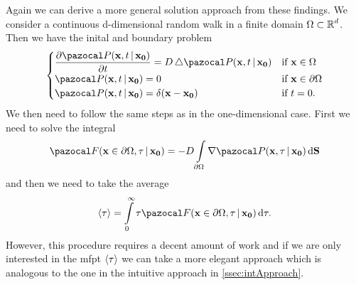 \bigskip

\noindent Again we can derive a more general solution approach from these findings. We consider a continuous d-dimensional random walk in a finite domain $\Omega \subset \operatorname{\mathbb{R}}^d$. Then we have the inital and boundary problem
\begin{equation*}
 \begin{cases}
  \dfrac{\partial \P(\bv{x}, t \,|\, \bv{x_0})}{\partial t} = D \Laplace \P(\bv{x}, t \,|\, \bv{x_0}) & \textrm{if } \bv{x} \in \Omega \\
  \P(\bv{x},t \,|\, \bv{x_0}) = 0 & \textrm{if } \bv{x} \in \partial \Omega \\
  \P(\bv{x},t \,|\, \bv{x_0}) = \delta(\bv{x}-\bv{x_0}) & \textrm{if } t = 0.
 \end{cases}
\end{equation*}
We then need to follow the same steps as in the one-dimensional case. First we need to solve the integral
\begin{equation*}
 \F(\bv{x} \in \partial \Omega, \tau \,|\, \bv{x_0}) = -D\int\limits_{\partial \Omega} \nabla \P(\bv{x}, \tau \,|\, \bv{x_0}) \diff \bv{S}
\end{equation*}
and then we need to take the average
\begin{equation*}
 \mfpt = \int\limits_0^\infty \tau \F(\bv{x} \in \partial \Omega, \tau \,|\, \bv{x_0}) \diff \tau.
\end{equation*}
However, this procedure requires a decent amount of work and if we are only interested in the \ac{mfpt} $\left<\tau\right>$ we can take a more elegant approach which is analogous to the one in the intuitive approach in \autoref{ssec:intApproach}.

